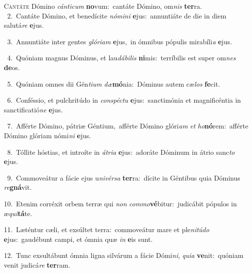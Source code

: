 \lettrine{\initial\textcolor{\initialcolor}{C}}{antáte} Dómino \textit{cán}\-\textit{ti}\textit{cum} \textbf{no}\-vum:~\star cantáte Dómino, om\textit{nis} \textbf{ter}\-ra.\\
{\numbfont\textcolor{\numbcolor}{~2.}}~Cantáte Dómino, et benedícite \textit{nó}\-\textit{mi}\textit{ni} \textbf{e}\-jus:~\star annuntiáte de die in diem salutá\textit{re} \textbf{e}\-jus.\par
{\numbfont\textcolor{\numbcolor}{~3.}}~Annuntiáte inter gentes \textit{gló}\-\textit{ri}\textit{am} \textbf{e}\-jus,~\star in ómnibus pópulis mirabíli\textit{a} \textbf{e}\-jus.\par
{\numbfont\textcolor{\numbcolor}{~4.}}~Quóniam magnus Dóminus, et lau\-\textit{dá}\-\textit{bi}\textit{lis} \textbf{ni}\-mis:~\star terríbilis est super om\textit{nes} \textbf{de}\-os.\par
{\numbfont\textcolor{\numbcolor}{~5.}}~Quóniam omnes dii Gén\-\textit{ti}\-\textit{um} \textit{dæ}\-\textbf{mó}nia:~\star Dóminus autem cæ\textit{los} \textbf{fe}\-cit.\par
{\numbfont\textcolor{\numbcolor}{~6.}}~Conféssio, et pulchritúdo in \textit{con}\-\textit{spéc}\textit{tu} \textbf{e}\-jus:~\star sanctimónia et magnificéntia in sanctificatió\textit{ne} \textbf{e}\-jus.\par
{\numbfont\textcolor{\numbcolor}{~7.}}~Afférte Dómino, pátriæ Géntium,~\dagger afférte Dómino glóri\textit{am} \textit{et} \textit{ho}\-\textbf{nó}rem:~\star afférte Dómino glóriam nómi\textit{ni} \textbf{e}\-jus.\par
{\numbfont\textcolor{\numbcolor}{~8.}}~Tóllite hóstias, et introíte in \textit{á}\-\textit{tri}\textit{a} \textbf{e}\-jus:~\star adoráte Dóminum in átrio sanc\textit{to} \textbf{e}\-jus.\par
{\numbfont\textcolor{\numbcolor}{~9.}}~Commoveátur a fácie ejus u\-\textit{ni}\-\textit{vér}\textit{sa} \textbf{ter}\-ra:~\star dícite in Géntibus quia Dóminus \textit{re}\-\textbf{gná}vit.\par
{\numbfont\textcolor{\numbcolor}{10.}}~Etenim corréxit orbem terræ qui \textit{non} \textit{com}\-\textit{mo}\textbf{vé}bitur:~\star judicábit pópulos in æ\-\textit{qui}\-\textbf{tá}te.\par
{\numbfont\textcolor{\numbcolor}{11.}}~Læténtur cæli, et exsúltet terra:~\dagger commoveátur mare et ple\-\textit{ni}\-\textit{tú}\textit{do} \textbf{e}\-jus:~\star gaudébunt campi, et ómnia quæ \textit{in} \textbf{e}\-is sunt.\par
{\numbfont\textcolor{\numbcolor}{12.}}~Tunc exsultábunt ómnia ligna silvárum a fácie Dómi\-\textit{ni}\-, \textit{qui}\-\textit{a} \textbf{ve}\-nit:~\star quóniam venit judicá\textit{re} \textbf{ter}\-ram.\par
